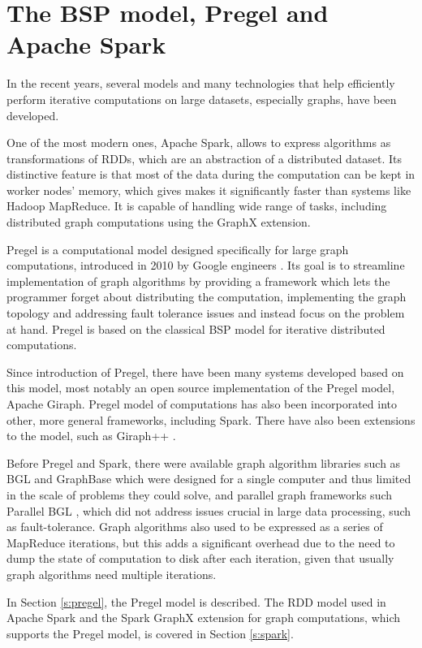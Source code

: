
\chapter{The BSP model, Pregel and Apache Spark}\label{r:pregel}
In the recent years, several models and many technologies that help efficiently perform iterative computations on large datasets, especially graphs, have been developed.

One of the most modern ones, Apache Spark, allows to express algorithms as transformations of RDDs, which are an abstraction of a distributed dataset. Its distinctive feature is that most of the data during the computation can be kept in worker nodes' memory, which gives makes it significantly faster than systems like Hadoop MapReduce. It is capable of handling wide range of tasks, including distributed graph computations using the GraphX extension.

Pregel is a computational model designed specifically for large graph computations, introduced in 2010 by Google engineers \cite{pregel}. Its goal is to streamline implementation of graph algorithms by providing a framework which lets the programmer forget about distributing the computation, implementing the graph topology and addressing fault tolerance issues and instead focus on the problem at hand. Pregel is based on the classical BSP model \cite{bsp} for iterative distributed computations.

Since introduction of Pregel, there have been many systems developed based on this model, most notably an open source implementation of the Pregel model, Apache Giraph. Pregel model of computations has also been incorporated into other, more general frameworks, including Spark. There have also been extensions to the model, such as Giraph++ \cite{giraphpp}.

Before Pregel and Spark, there were available graph algorithm libraries such as BGL \cite{bgl} and GraphBase \cite{GraphBase} which were designed for a single computer and thus limited in the scale of problems they could solve, and parallel graph frameworks such Parallel BGL \cite{parallelbgl}, which did not address issues crucial in large data processing, such as fault-tolerance. Graph algorithms also used to be expressed as a series of MapReduce iterations, but this adds a significant overhead due to the need to dump the state of computation to disk after each iteration, given that usually graph algorithms need multiple iterations.

In Section \ref{s:pregel}, the Pregel model is described. The RDD model used in Apache Spark and the Spark GraphX extension for graph computations, which supports the Pregel model, is covered in Section \ref{s:spark}.

